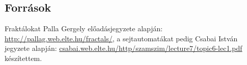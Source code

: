 \documentclass[12pt]{article}
\theoremstyle{plain}
\begin{document}
\subsection*{Források} 
Fraktálokat Palla Gergely előadásjegyzete alapján: \url{http://pallag.web.elte.hu/fractals/}, a sejtautomatákat pedig Csabai István jegyzete alapján: \url{csabai.web.elte.hu/http/szamszim/lecture7/topic6-lec1.pdf} készítettem.
 



\end{document}
